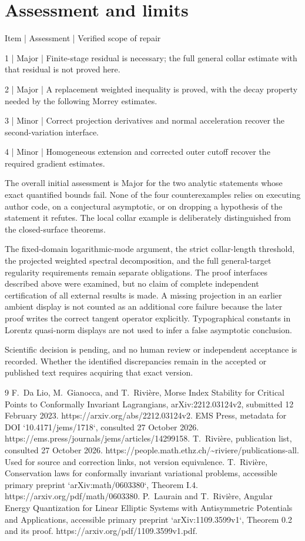\documentclass[10pt]{article}
\begin{document}
\section*{Assessment and limits}
Item | Assessment | Verified scope of repair\par
1 | Major | Finite-stage residual is necessary; the full general collar estimate with that residual is not proved here.\par
2 | Major | A replacement weighted inequality is proved, with the decay property needed by the following Morrey estimates.\par
3 | Minor | Correct projection derivatives and normal acceleration recover the second-variation interface.\par
4 | Minor | Homogeneous extension and corrected outer cutoff recover the required gradient estimates.\par
The overall initial assessment is Major for the two analytic statements whose exact quantified bounds fail. None of the four counterexamples relies on executing author code, on a conjectural asymptotic, or on dropping a hypothesis of the statement it refutes. The local collar example is deliberately distinguished from the closed-surface theorems.\par
The fixed-domain logarithmic-mode argument, the strict collar-length threshold, the projected weighted spectral decomposition, and the full general-target regularity requirements remain separate obligations. The proof interfaces described above were examined, but no claim of complete independent certification of all external results is made. A missing projection in an earlier ambient display is not counted as an additional core failure because the later proof writes the correct tangent operator explicitly. Typographical constants in Lorentz quasi-norm displays are not used to infer a false asymptotic conclusion.\par
Scientific decision is pending, and no human review or independent acceptance is recorded. Whether the identified discrepancies remain in the accepted or published text requires acquiring that exact version.\par
9 F. Da Lio, M. Gianocca, and T. Rivière, Morse Index Stability for Critical Points to Conformally Invariant Lagrangians, arXiv:2212.03124v2, submitted 12 February 2023. https://arxiv.org/abs/2212.03124v2. EMS Press, metadata for DOI `10.4171/jems/1718`, consulted 27 October 2026. https://ems.press/journals/jems/articles/14299158. T. Rivière, publication list, consulted 27 October 2026. https://people.math.ethz.ch/\textasciitilde{}riviere/publications-all. Used for source and correction links, not version equivalence. T. Rivière, Conservation laws for conformally invariant variational problems, accessible primary preprint `arXiv:math/0603380`, Theorem I.4. https://arxiv.org/pdf/math/0603380. P. Laurain and T. Rivière, Angular Energy Quantization for Linear Elliptic Systems with Antisymmetric Potentials and Applications, accessible primary preprint `arXiv:1109.3599v1`, Theorem 0.2 and its proof. https://arxiv.org/pdf/1109.3599v1.pdf.\par
\end{document}
